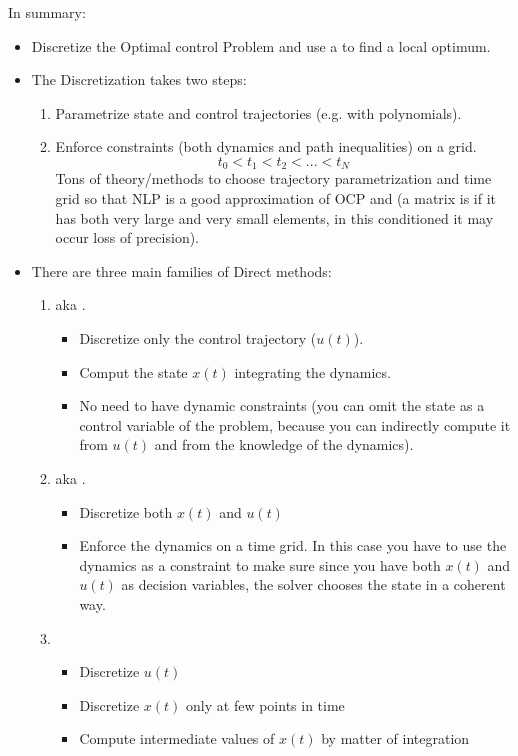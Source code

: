 In summary:
\begin{itemize}
\item Discretize the Optimal control Problem and use a  to find a local optimum.
\item The Discretization takes two steps:
\begin{enumerate}
\item Parametrize state and control trajectories (e.g. with polynomials).
\item Enforce constraints (both dynamics and path inequalities) on a grid.
\[t_0 < t_1 < t_2 < ... < t_N\]
Tons of theory/methods to choose trajectory parametrization and time grid so that NLP is a good approximation of OCP and  (a matrix is  if it has both very large and very small elements, in this conditioned it may occur loss of precision).
\end{enumerate}
\item There are three main families of Direct methods:
\begin{enumerate}
\item {} aka .
\begin{itemize}
\item Discretize only the control trajectory ($u(t)$).
\item Comput the state $x(t)$ integrating the dynamics.
\item No need to have dynamic constraints (you can omit the state as a control variable of the problem, because you can indirectly compute it from $u(t)$ and from the knowledge of the dynamics).
\end{itemize}
\item {} aka .
\begin{itemize}
\item Discretize both $x(t)$ and $u(t)$
\item Enforce the dynamics on a time grid. In this case you have to use the dynamics as a constraint to make sure since you have both $x(t)$ and $u(t)$ as decision variables, the solver chooses the state in a coherent way.
\end{itemize}
\item {}
\begin{itemize}
\item Discretize $u(t)$
\item Discretize $x(t)$ only at few points in time
\item Compute intermediate values of $x(t)$ by matter of integration
\end{itemize}
\end{enumerate}
\end{itemize}

